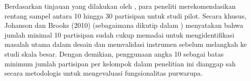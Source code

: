 Berdasarkan tinjauan yang dilakukan oleh \textcite{Sukserm2024}, para peneliti merekomendasikan rentang sampel antara 10 hingga 30 partisipan untuk studi pilot. Secara khusus, Johanson dan Brooks (2010) (sebagaimana dikutip dalam \textcite{Sukserm2024}) menyatakan bahwa jumlah minimal 10 partisipan sudah cukup memadai untuk mengidentifikasi masalah utama dalam desain dan memvalidasi instrumen sebelum melangkah ke studi skala besar. Dengan demikian, penggunaan angka 10 sebagai batas minimum jumlah partisipan per kelompok dalam penelitian ini dianggap sah secara metodologis untuk mengevaluasi fungsionalitas purwarupa.

